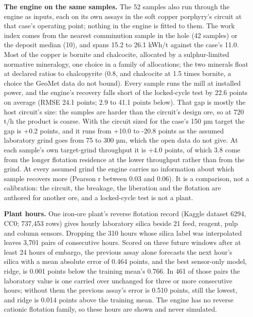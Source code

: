 \documentclass[10pt]{article}
\begin{document}
\textbf{The engine on the same samples.} The 52 samples also run through
the engine as inputs, each on its own assays in the soft copper
porphyry's circuit at that case's operating point; nothing in the engine
is fitted to them. The work index comes from the nearest comminution
sample in the hole (42 samples) or the deposit median (10), and spans
15.2 to 26.1 kWh/t against the case's 11.0. Most of the copper is
bornite and chalcocite, allocated by a sulphur-limited normative
mineralogy, one choice in a family of allocations; the two minerals
float at declared ratios to chalcopyrite (0.8, and chalcocite at 1.5
times bornite, a choice the GeoMet data do not bound). Every sample runs
the mill at installed power, and the engine's recovery falls short of
the locked-cycle test by 22.6 points on average (RMSE 24.1 points; 2.9
to 41.1 points below). That gap is mostly the host circuit's size: the
samples are harder than the circuit's design ore, so at 720 t/h the
product is coarse. With the circuit sized for the case's 150 µm target
the gap is +0.2 points, and it runs from +10.0 to -20.8 points as the
assumed laboratory grind goes from 75 to 300 µm, which the open data do
not give. At each sample's own target-grind throughput it is +4.0
points, of which 3.8 come from the longer flotation residence at the
lower throughput rather than from the grind. At every assumed grind the
engine carries no information about which sample recovers more (Pearson
r between 0.03 and 0.06). It is a comparison, not a calibration: the
circuit, the breakage, the liberation and the flotation are authored for
another ore, and a locked-cycle test is not a plant.

\textbf{Plant hours.} One iron-ore plant's reverse flotation record
(Kaggle dataset 6294, CC0; 737,453 rows) \cite{oliveira2017} gives
hourly laboratory silica beside 21 feed, reagent, pulp and column
sensors. Dropping the 310 hours whose silica label was interpolated
leaves 3,701 pairs of consecutive hours. Scored on three future windows
after at least 24 hours of embargo, the previous assay alone forecasts
the next hour's silica with a mean absolute error of 0.464 points, and
the best sensor-only model, ridge, is 0.001 points below the training
mean's 0.766. In 461 of those pairs the laboratory value is one carried
over unchanged for three or more consecutive hours; without them the
previous assay's error is 0.510 points, still the lowest, and ridge is
0.014 points above the training mean. The engine has no reverse cationic
flotation family, so these hours are shown and never simulated.
\end{document}
